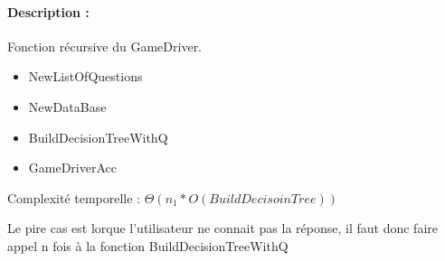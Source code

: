 \documentclass[10pt,a4paper]{article}
\begin{document}
\paragraph{Description :} Fonction récursive du GameDriver.

\begin{itemize}
\item NewListOfQuestions
\item NewDataBase
\item BuildDecisionTreeWithQ
\item GameDriverAcc
\end{itemize}

Complexité temporelle : $\Theta(n_1 * O(BuildDecisoinTree))$

Le pire cas est lorque l'utilisateur ne connait pas la réponse, il faut donc faire appel n fois à la fonction BuildDecisionTreeWithQ
\end{document}
